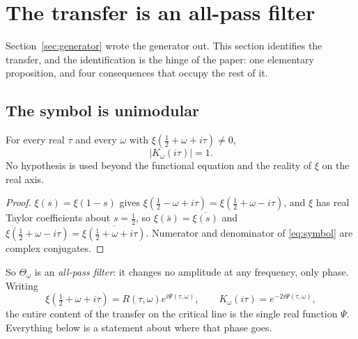 \section{The transfer is an all-pass filter}\label{sec:allpass}

Section~\ref{sec:generator} wrote the generator out. This section identifies the
transfer, and the identification is the hinge of the paper: one elementary
proposition, and four consequences that occupy the rest of it.

\subsection{The symbol is unimodular}

\begin{proposition}[Unimodularity]\label{prop:unimodular}
For every real $\tau$ and every $\omega$ with $\xi(\frac12+\omega+i\tau)\neq0$,
\[
 |K_\omega(i\tau)|=1 .
\]
No hypothesis is used beyond the functional equation and the reality of $\xi$ on
the real axis.
\end{proposition}

\begin{proof}
$\xi(s)=\xi(1-s)$ gives
$\xi(\frac12-\omega+i\tau)=\xi(\frac12+\omega-i\tau)$, and $\xi$ has real Taylor
coefficients about $s=\frac12$, so $\xi(\bar s)=\overline{\xi(s)}$ and
$\xi(\frac12+\omega-i\tau)=\overline{\xi(\frac12+\omega+i\tau)}$. Numerator and
denominator of \eqref{eq:symbol} are complex conjugates.
\end{proof}

So $\Theta_\omega$ is an \emph{all-pass filter}: it changes no amplitude at any
frequency, only phase. Writing
\begin{equation}\label{eq:phase}
 \xi(\tfrac12+\omega+i\tau)=R(\tau,\omega)e^{i\Psi(\tau,\omega)},
 \qquad K_\omega(i\tau)=e^{-2i\Psi(\tau,\omega)},
\end{equation}
the entire content of the transfer on the critical line is the single real
function $\Psi$. Everything below is a statement about where that phase goes.

